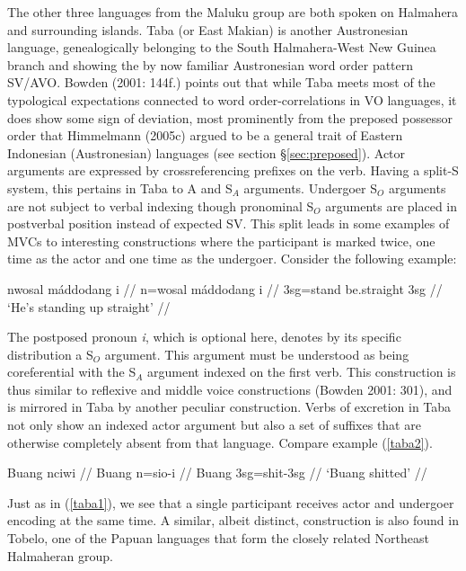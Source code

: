 The other three languages from the Maluku group are both spoken on Halmahera and surrounding islands. Taba (or East Makian) is another Austronesian language, genealogically belonging to the South Halmahera-West New Guinea branch and showing the by now familiar Austronesian word order pattern SV/AVO. Bowden (2001: 144f.) points out that while Taba meets most of the typological expectations connected to word order-correlations in VO languages, it does show some sign of deviation, most prominently from the preposed possessor order that Himmelmann (2005c) argued to be a general trait of Eastern Indonesian (Austronesian) languages (see section §\ref{sec:preposed}). Actor arguments are expressed by crossreferencing prefixes on the verb. Having a split-S system, this pertains in Taba to A and S$_A$ arguments. Undergoer S$_O$ arguments are not subject to verbal indexing though pronominal S$_O$ arguments are placed in postverbal position instead of expected SV. This split leads in some examples of MVCs to interesting constructions where the participant is marked twice, one time as the actor and one time as the undergoer. Consider the following example:

\ex \label{taba1}
\begingl
\gla nwosal máddodang i // 
\glb n=wosal máddodang i //
\glc \acs{3}\acs{sg}=stand be.straight \acs{3}\acs{sg} //
\glft `He's standing up straight' // 
\endgl
\xe

The postposed pronoun \textit{i}, which is optional here, denotes by its specific distribution a S$_O$ argument. This argument must be understood as being coreferential with the S$_A$ argument indexed on the first verb. This construction is thus similar to reflexive and middle voice constructions (Bowden 2001: 301), and is mirrored in Taba by another peculiar construction. Verbs of excretion in Taba not only show an indexed actor argument but also a set of suffixes that are otherwise completely absent from that language. Compare example (\ref{taba2}).

\ex \label{taba2}
\begingl
\gla Buang nciwi // 
\glb Buang n=sio-i //
\glc Buang \acs{3}\acs{sg}=shit-\acs{3}\acs{sg} //
\glft `Buang shitted' // 
\endgl
\xe

Just as in (\ref{taba1}), we see that a single participant receives actor and undergoer encoding at the same time. A similar, albeit distinct, construction is also found in Tobelo, one of the Papuan languages that form the closely related Northeast Halmaheran group. 

